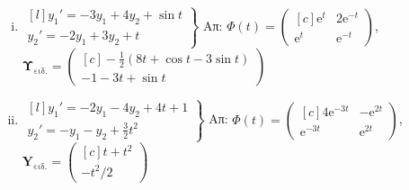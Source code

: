 \begin{enumerate}
\begin{enumerate}[i)]
      \item $ 
        \left.
          \begin{matrix*}[l]
            y_{1}'=-3 y_{1}+4 y_{2}+ \sin{t} \\
            y_{2}'=-2 y_{1}+3 y_{2}+t
          \end{matrix*} 
        \right\} $
        \hfill Απ: $ \Phi(t) = 
        \begin{pmatrix*}[c]
          \mathrm{e}^{t} & 2\mathrm{e}^{-t} \\
          \mathrm{e}^{t} & \mathrm{e}^{-t}
        \end{pmatrix*} $, \; $ \mathbf{Υ}_{\text{ειδ.}} = 
        \begin{pmatrix*}[c] 
          - \frac{1}{2} (8t+ \cos{t} -3 \sin{t}) \\ -1-3t+ \sin{t}
        \end{pmatrix*} $   

      \item $ 
        \left.
          \begin{matrix*}[l]
            y_{1}'=-2 y_{1}-4 y_{2}+4t+1 \\
            y_{2}'=- y_{1}- y_{2} + \frac{3}{2} t^{2}
          \end{matrix*} 
        \right\} $
        \hfill Απ: $ \Phi(t) = 
        \begin{pmatrix*}[c]
          4 \mathrm{e}^{-3t} & - \mathrm{e}^{2t} \\
          \mathrm{e}^{-3t} & \mathrm{e}^{2t}
        \end{pmatrix*} $, \; $ \mathbf{Y}_{\text{ειδ.}} = 
        \begin{pmatrix*}[c] 
          t+t^{2} \\ - t^{2}/2
        \end{pmatrix*} $   
    \end{enumerate}
\end{enumerate}





